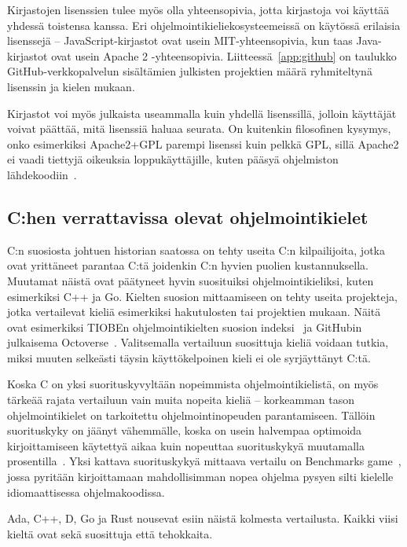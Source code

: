 Kirjastojen lisenssien tulee myös olla yhteensopivia, jotta kirjastoja voi
käyttää yhdessä toistensa kanssa. Eri ohjelmointikieliekosysteemeissä on
käytössä erilaisia lisenssejä -- JavaScript-kirjastot ovat usein
MIT-yhteensopivia, kun taas Java-kirjastot ovat usein Apache 2 -yhteensopivia.
Liitteessä~\ref{app:github} on taulukko GitHub-verkkopalvelun sisältämien
julkisten projektien määrä ryhmiteltynä lisenssin ja kielen mukaan.

Kirjastot voi myös julkaista useammalla kuin yhdellä lisenssillä, jolloin
käyttäjät voivat päättää, mitä lisenssiä haluaa seurata. On kuitenkin
filosofinen kysymys, onko esimerkiksi Apache2+GPL parempi lisenssi kuin pelkkä
GPL, sillä Apache2 ei vaadi tiettyjä oikeuksia loppukäyttäjille, kuten pääsyä
ohjelmiston lähdekoodiin~\citep{apachetldr, gpl3tldr}.

\subsection{C:hen verrattavissa olevat ohjelmointikielet}

C:n suosiosta johtuen historian saatossa on tehty useita C:n kilpailijoita,
jotka ovat yrittäneet parantaa C:tä joidenkin C:n hyvien puolien
kustannuksella. Muutamat näistä ovat päätyneet hyvin suosituiksi
ohjelmointikieliksi, kuten esimerkiksi C++ ja Go. Kielten suosion mittaamiseen
on tehty useita projekteja, jotka vertailevat kieliä esimerkiksi hakutulosten
tai projektien mukaan. Näitä ovat esimerkiksi TIOBEn ohjelmointikielten suosion
indeksi~\citep{tiobe} ja GitHubin julkaisema Octoverse~\citep{octoverse}.
Valitsemalla vertailuun suosittuja kieliä voidaan tutkia, miksi muuten selkeästi
täysin käyttökelpoinen kieli ei ole syrjäyttänyt C:tä.

Koska C on yksi suorituskyvyltään nopeimmista ohjelmointikielistä, on myös
tärkeää rajata vertailuun vain muita nopeita kieliä -- korkeamman tason
ohjelmointikielet on tarkoitettu ohjelmointinopeuden parantamiseen. Tällöin
suorituskyky on jäänyt vähemmälle, koska on usein halvempaa optimoida
kirjoittamiseen käytettyä aikaa kuin nopeuttaa suorituskykyä muutamalla
prosentilla~\citationneeded. Yksi kattava suorituskykyä mittaava vertailu on
Benchmarks game~\citep{benchmarks}, jossa pyritään kirjoittamaan mahdollisimman
nopea ohjelma pysyen silti kielelle idiomaattisessa ohjelmakoodissa.

Ada, C++, D, Go ja Rust nousevat esiin näistä kolmesta vertailusta. Kaikki
viisi kieltä ovat sekä suosittuja että tehokkaita.

